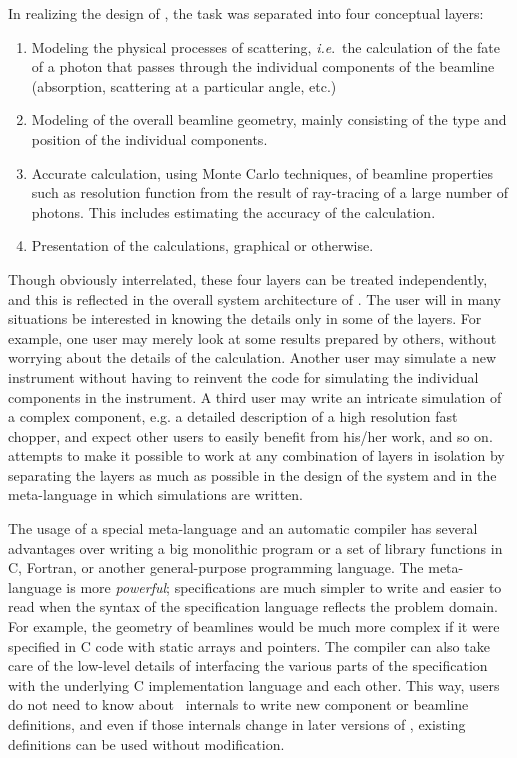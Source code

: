 In realizing the design of \MCX, the task was
separated into four conceptual layers:
\begin{enumerate}
\item Modeling the physical processes of scattering, \textit{i.e}.\
  the calculation of the fate of a photon that passes through the
  individual components of the beamline (absorption, scattering at a
  particular angle, etc.)
\item Modeling of the overall beamline geometry, mainly consisting
  of the type and position of the individual components.
\item Accurate calculation, using Monte Carlo techniques, of
  beamline properties such as resolution function from the result of
  ray-tracing of a large number of photons. This includes estimating
  the accuracy of the calculation.
\item Presentation of the calculations, graphical or otherwise.
\end{enumerate}

Though obviously interrelated, these four layers can be
treated independently, and this is reflected in the overall system
architecture of \MCX. The user will in many situations be
interested in knowing the details only in some of the layers. For
example, one user may merely look at some results prepared by others,
without worrying about the details of the calculation. Another user
may simulate a new instrument without having to reinvent the
code for simulating the individual components in the instrument. A third
user may write an intricate simulation of a complex component,
e.g. a detailed description of a high resolution fast chopper,
and expect other users to easily
benefit from his/her work, and so on. \MCX attempts to make it
possible to work at any combination of layers in isolation by separating
the layers as much as possible in the design of the system and in
the meta-language in which simulations are written.

The usage of a special meta-language and an automatic compiler has
several advantages over writing a big monolithic program or a set of
library functions in C, Fortran, or another general-purpose programming
language.  The meta-language is more \textit{powerful}; specifications
are much simpler to write and easier to read when the syntax of the
specification language reflects the problem domain. For example, the
geometry of beamlines would be much more complex if it were specified
in C code with static arrays and pointers. The compiler can also take
care of the low-level details of interfacing the various parts of the
specification with the underlying C implementation language and each
other. This way, users do not need to know about \MCX\ internals to
write new component or beamline definitions, and even if those
internals change in later versions of \MCX, existing definitions can be
used without modification.

